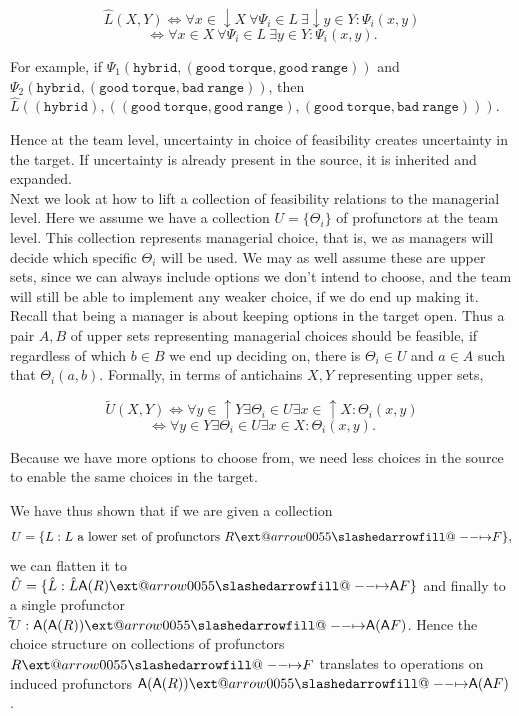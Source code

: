 \documentclass[12pt]{article}
\makeatletter
\theoremstyle{definition}
\theoremstyle{plain}
\theoremstyle{plain}
\theoremstyle{plain}
\theoremstyle{plain}
\theoremstyle{remark}
\theoremstyle{remark}
\newcommand{\ac}{\mathsf{A}}
\def\slashedarrowfill@#1#2#3#4#5{%
	$\m@th\thickmuskip0mu\medmuskip\thickmuskip\thinmuskip\thickmuskip
	\relax#5#1\mkern-7mu%
	\cleaders\hbox{$#5\mkern-2mu#2\mkern-2mu$}\hfill
	\mathclap{#3}\mathclap{#2}%
	\cleaders\hbox{$#5\mkern-2mu#2\mkern-2mu$}\hfill
	\mkern-7mu#4$%
}
\def\rightslashedarrowfill@{%
	\slashedarrowfill@\relbar\relbar\mapstochar\rightarrow}
\newcommand\xslashedrightarrow[2][]{%
	\ext@arrow 0055{\rightslashedarrowfill@}{#1}{#2}}
\makeatother
\begin{document}
$$\hat L(X,Y) \iff \forall x \in \downarrow X \: \forall \Psi_i \in L \: \exists \downarrow y \in Y : \Psi_i(x,y)$$ 
$$\iff \forall x \in X \: \forall \Psi_i \in L \: \exists y \in Y : \Psi_i(x,y).$$

For example, if $\Psi_1(\mathtt{hybrid},\mathtt{(good\ torque, good\ range)})$ and $\Psi_2(\mathtt{hybrid},\mathtt{(good\ torque, bad\ range)})$, then $\hat L(\mathtt{(hybrid)},\mathtt{((good\ torque, good\ range),(good\ torque, bad\ range))})$.

Hence at the team level, uncertainty in choice of feasibility creates uncertainty in the target. If uncertainty is already present in the source, it is inherited and expanded. \\

Next we look at how to lift a collection of feasibility relations to the managerial level. Here we assume we have a collection $U = \{\Theta_i\}$ of profunctors at the team level. This collection represents managerial choice, that is, we as managers will decide which specific $\Theta_i$ will be used. We may as well assume these are upper sets, since we can always include options we don't intend to choose, and the team will still be able to implement any weaker choice, if we do end up making it. Recall that being a manager is about keeping options in the target open. Thus a pair $A,B$ of upper sets representing managerial choices should be feasible, if regardless of which $b \in B$ we end up deciding on, there is $\Theta_i \in U$ and $a \in A$ such that $\Theta_i(a,b)$. Formally, in terms of antichains $X,Y$ representing upper sets,

$$\tilde U(X,Y) \iff \forall y \in \uparrow Y \exists \Theta_i \in U \exists x \in \uparrow X : \Theta_i(x,y) $$
$$\iff \forall y \in Y \exists \Theta_i \in U \exists x \in X : \Theta_i(x,y).$$

Because we have more options to choose from, we need less choices in the source to enable the same choices in the target.

We have thus shown that if we are given a collection $$U = \{L : L \text{ a lower set of profunctors  } R \xslashedrightarrow{} F\},$$ we can flatten it to $\hat U = \{\hat L : \hat L \ac(R) \xslashedrightarrow{} \ac{F}\} $ and finally to a single profunctor $\tilde \hat U:\ac(\ac(R)) \xslashedrightarrow{} \ac(\ac{F})$. Hence the choice structure on collections of profunctors $R \xslashedrightarrow{} F$ translates to operations on induced profunctors $\ac(\ac(R)) \xslashedrightarrow{} \ac(\ac{F})$. \\
\end{document}
